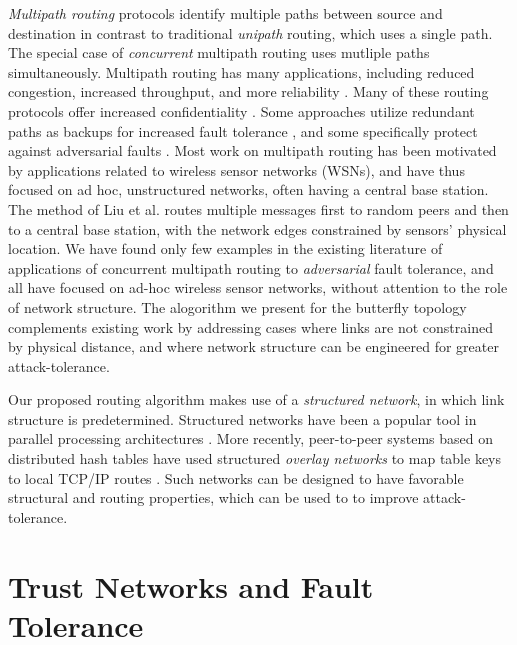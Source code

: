 \documentclass[twocolumn]{article}
\begin{document}
{\em Multipath routing} protocols identify multiple paths between
source and destination
in contrast to traditional {\em unipath} routing, which uses
a single path.
The special case of {\em concurrent} multipath routing uses mutliple paths
simultaneously.
Multipath routing has many applications, including reduced congestion,
increased throughput, and more reliability
\cite{qadir_exploiting_2015}.
Many of these routing protocols offer increased confidentiality
\cite{zin_survey_2015}.
Some approaches utilize redundant paths as backups for increased
fault tolerance
\cite{alrajeh_secure_2013},
and some specifically protect against adversarial faults
\cite{kohno_improvement_2012, khalil_unmask:_2010, lou_h-spread:_2006}.
Most work on multipath routing has been motivated by applications related to
wireless sensor networks (WSNs),
and have thus focused on ad hoc, unstructured networks, often having a central
base station.
The method of Liu et al.
\cite{liu_secure_2012}
routes multiple messages first to random peers and then
to a central base station,
with the network edges constrained by sensors' physical location.
We have found only few examples in the existing literature of applications of
concurrent multipath routing to {\em adversarial} fault tolerance,
and all have focused on ad-hoc wireless sensor networks, without attention
to the role of network structure.
The alogorithm we present for the butterfly topology complements existing work
by addressing cases where links are not constrained by physical
distance,
and where network structure can be engineered for greater attack-tolerance.

Our proposed routing algorithm makes use of a
{\em structured network}, in which link structure is predetermined.
Structured networks have been a popular tool in parallel processing
architectures \cite{kshemkalyani_distributed_2008}.
More recently, peer-to-peer systems based on distributed hash tables have used
structured {\em overlay networks} to map table keys to local TCP/IP routes
\cite{lua_survey_2005,korzun_structured_2013}.
Such networks can be designed to have favorable structural and routing
properties,
which can be used to to improve attack-tolerance.

\section{Trust Networks and Fault Tolerance}
\label{sec-ft}
\end{document}
